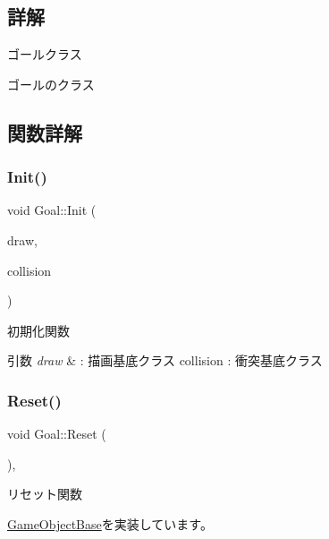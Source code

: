 \subsection{詳解}
ゴールクラス 

ゴールのクラス 

\subsection{関数詳解}
\mbox{\label{class_goal_a694beb5a9164e2bea59fc43affbaa060}} 
\subsubsection{\texorpdfstring{Init()}{Init()}}
{\footnotesize\ttfamily void Goal\+::\+Init (\begin{DoxyParamCaption}\item[{\mbox{\hyperlink{class_draw_base}{Draw\+Base}} $\ast$}]{draw,  }\item[{\mbox{\hyperlink{class_collision_base}{Collision\+Base}} $\ast$}]{collision }\end{DoxyParamCaption})}



初期化関数 


\begin{DoxyParams}{引数}
{\em draw} & \+: 描画基底クラス collision \+: 衝突基底クラス \\
\hline
\end{DoxyParams}
\mbox{\label{class_goal_a98b797c8012ab43d6fc8c42e4e91466b}} 
\subsubsection{\texorpdfstring{Reset()}{Reset()}}
{\footnotesize\ttfamily void Goal\+::\+Reset (\begin{DoxyParamCaption}{ }\end{DoxyParamCaption})\hspace{0.3cm}{\ttfamily [override]}, {\ttfamily [virtual]}}



リセット関数 



\mbox{\hyperlink{class_game_object_base_a85c59554f734bcb09f1a1e18d9517dce}{Game\+Object\+Base}}を実装しています。

